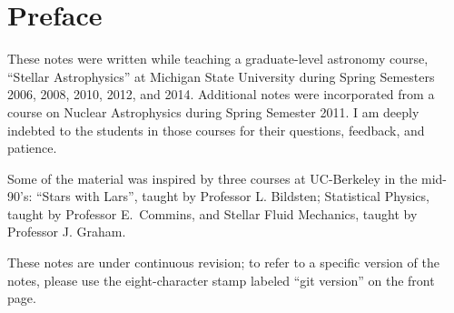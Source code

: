 
\section*{Preface}
These notes were written while teaching a graduate-level astronomy course, ``Stellar Astrophysics'' at Michigan State University during Spring Semesters 2006, 2008, 2010, 2012, and 2014.  Additional notes were incorporated from a course on Nuclear Astrophysics during Spring Semester 2011. I am deeply indebted to the students in those courses for their questions, feedback, and patience.

Some of the material was inspired by three courses at UC-Berkeley in the mid-90's: ``Stars with Lars'', taught by Professor L. Bildsten; Statistical Physics, taught by Professor E.~Commins, and Stellar Fluid Mechanics, taught by Professor J. Graham.

These notes are under continuous revision; to refer to a specific version of the notes, please use the eight-character stamp labeled ``git version'' on the front page.
